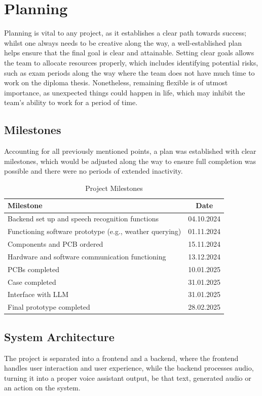 \cleardoubleemptypage
\renewcommand*\chapterpagestyle{scrheadings}
\chapter{Planning}
Planning is vital to any project, as it establishes a clear path towards success;
whilst one always needs to be creative along the way, a well-established plan
helps ensure that the final goal is clear and attainable.
Setting clear goals allows the team to allocate resources properly,
which includes identifying potential risks, such as exam periods along the way
where the team does not have much time to work on the diploma thesis.
Nonetheless, remaining flexible is of utmost importance, as unexpected things
could happen in life, which may inhibit the team's ability to work for a period of time.

\section{Milestones}
Accounting for all previously mentioned points, a plan was established with clear milestones,
which would be adjusted along the way to ensure full completion was possible
and there were no periods of extended inactivity.

\begin{table}[h!]
\centering
\begin{tabular}{|l|c|}
\hline
\textbf{Milestone} & \textbf{Date} \\
\hline
Backend set up and speech recognition functions & 04.10.2024 \\
Functioning software prototype (e.g., weather querying) & 01.11.2024 \\
Components and PCB ordered & 15.11.2024 \\
Hardware and software communication functioning & 13.12.2024 \\
PCBs completed & 10.01.2025 \\
Case completed & 31.01.2025 \\
Interface with LLM & 31.01.2025 \\
Final prototype completed & 28.02.2025 \\
\hline
\end{tabular}
\caption{Project Milestones}
\end{table}

\section{System Architecture}
The project is separated into a frontend and a backend, where the frontend handles user interaction and user experience,
while the backend processes audio, turning it into a proper voice assistant output,
be that text, generated audio or an action on the system.

